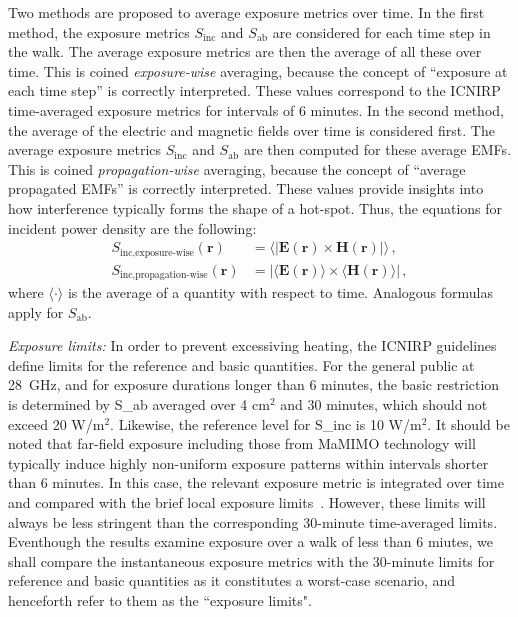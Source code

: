 \documentclass{IEEEtran}
\begin{document}
Two methods are proposed to average exposure metrics over time. In the first method, the exposure metrics $S_\mathrm{inc}$ and $S_\mathrm{ab}$ are considered for each time step in the walk. The average exposure metrics are then the average of all these over time. This is coined \textit{exposure-wise} averaging, because the concept of ``exposure at each time step” is correctly interpreted. These values correspond to the ICNIRP time-averaged exposure metrics for intervals of 6 minutes. In the second method, the average of the electric and magnetic fields over time is considered first. The average exposure metrics $S_\mathrm{inc}$ and $S_\mathrm{ab}$ are then computed for these average \glspl{EMF}. This is coined \textit{propagation-wise} averaging, because the concept of ``average propagated \glspl{EMF}” is correctly interpreted. These values provide insights into how interference typically forms the shape of a hot-spot. Thus, the equations for incident power density are the following:
\begin{equation}
\label{eq:exp_prop_wise}
\begin{aligned}
S_{\text{inc,exposure-wise}}(\mathbf{r}) &= \langle | \mathbf{E}(\mathbf{r}) \times \mathbf{H}(\mathbf{r}) | \rangle \, , \\
S_{\text{inc,propagation-wise}}(\mathbf{r}) &= |\langle\mathbf{E}(\mathbf{r})\rangle \times \langle\mathbf{H}(\mathbf{r})\rangle| \, ,
\end{aligned}
\end{equation}
where $\langle \cdot \rangle$ is the average of a quantity with respect to time. Analogous formulas apply for $S_\mathrm{ab}$.

\textit{Exposure limits:} In order to prevent excessiving heating, the ICNIRP guidelines~\cite{ICNIRP} define limits for the reference and basic quantities. For the general public at 28~GHz, and for exposure durations longer than 6 minutes, the basic restriction is determined by \gls{S_ab} averaged over 4 cm$^2$ and 30 minutes, which should not exceed 20 W/m$^2$. Likewise, the reference level for \gls{S_inc} is 10 W/m$^2$. It should be noted that far-field exposure including those from \gls{MaMIMO} technology will typically induce highly non-uniform exposure patterns within intervals shorter than 6 minutes. In this case, the relevant exposure metric is integrated over time and compared with the brief local exposure limits~\cite{ICNIRP}. However, these limits will always be less stringent than the corresponding 30-minute time-averaged limits. Eventhough the results examine exposure over a walk of less than 6 miutes, we shall compare the instantaneous exposure metrics with the 30-minute limits for reference and basic quantities as it constitutes a worst-case scenario, and henceforth refer to them as the ``exposure limits".
\end{document}
